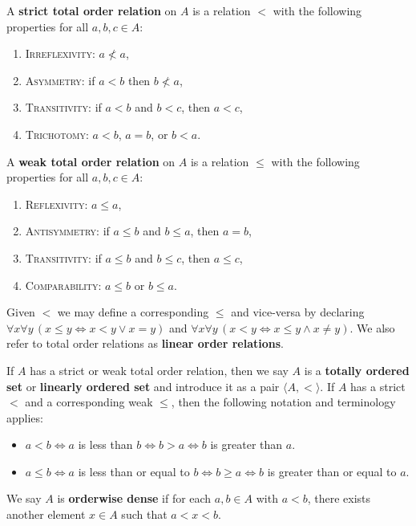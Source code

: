 \begin{definition}
	A \textbf{strict total order relation} on $A$ is a relation $<$ with the following properties for all $a, b, c\in A$:
	\begin{enumerate}[itemsep=-0.4ex, label=(T\arabic*)]
		\item \textsc{Irreflexivity:} $a \not< a$,
		\item \textsc{Asymmetry:} if $a < b$ then $b \not< a$,
		\item \textsc{Transitivity:} if $a < b$ and $b < c$, then $a < c$,
		\item \textsc{Trichotomy:} $a < b$, $a = b$, or $b < a$.
	\end{enumerate}
	A \textbf{weak total order relation} on $A$ is a relation $\le$ with the following properties for all $a, b, c\in A$:
	\begin{enumerate}[itemsep=-0.4ex, label=(T\arabic*$'$)]
		\item \textsc{Reflexivity:} $a\le a$,
		\item \textsc{Antisymmetry:} if $a\le b$ and $b\le a$, then $a = b$,
		\item \textsc{Transitivity:} if $a\le b$ and $b\le c$, then $a\le c$,
		\item \textsc{Comparability:} $a\le b$ or $b\le a$.
	\end{enumerate}
	Given $<$ we may define a corresponding $\le$ and vice-versa by declaring $\forall x\forall y\, (x\le y\iff x < y\lor x=y)$ and $\forall x\forall y\, (x < y\iff x\le y\land x\ne y)$.
	We also refer to total order relations as \textbf{linear order relations}.
\end{definition}

If $A$ has a strict or weak total order relation, then we say $A$ is a \textbf{totally ordered set} or \textbf{linearly ordered set} and introduce it as a pair $\langle A, <\rangle$.
If $A$ has a strict $<$ and a corresponding weak $\le$, then the following notation and terminology applies: 
\begin{itemize}[itemsep=-0.4ex]
	\item $a < b \iff a$ is less than $b \iff b > a \iff b$ is greater than $a$.
	\item $a\le b \iff a$ is less than or equal to $b \iff b\ge a \iff b$ is greater than or equal to $a$.
\end{itemize}
We say $A$ is \textbf{orderwise dense} if for each $a, b\in A$ with $a < b$, there exists another element $x\in A$ such that $a < x < b$. 

